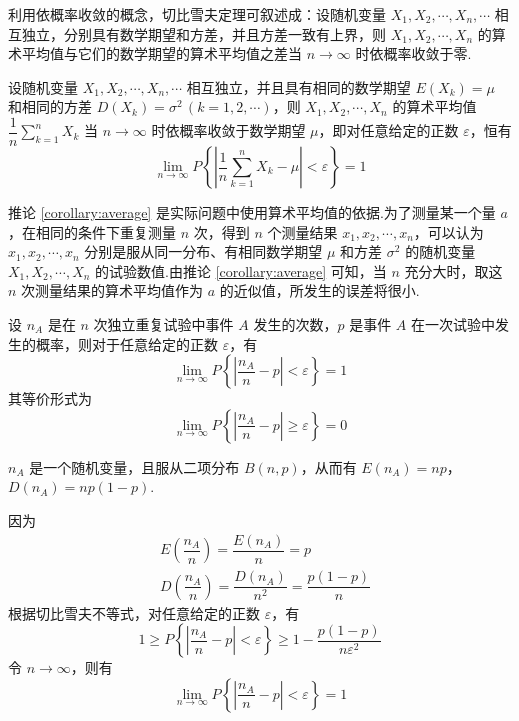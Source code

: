 利用依概率收敛的概念，切比雪夫定理可叙述成：设随机变量 $X_1, X_2, \cdots, X_n, \cdots$ 相互独立，分别具有数学期望和方差，并且方差一致有上界，则 $X_1, X_2, \cdots, X_n$ 的算术平均值与它们的数学期望的算术平均值之差当 $n \to \infty$ 时依概率收敛于零.

\begin{corollary} \label{corollary:average}
    设随机变量 $X_1, X_2, \cdots, X_n, \cdots$ 相互独立，并且具有相同的数学期望 $E(X_k) = \mu$ 和相同的方差 $D(X_k) = \sigma^2 \, (k=1,2,\cdots)$，则 $X_1, X_2, \cdots, X_n$ 的算术平均值 $\dfrac{1}{n} \displaystyle\sum_{k=1}^n X_k$ 当 $n \to \infty$ 时依概率收敛于数学期望 $\mu$，即对任意给定的正数 $\varepsilon$，恒有
    $$
    \lim_{n \to \infty} P \left\{ \left| \dfrac{1}{n} \sum_{k=1}^n X_k - \mu \right| < \varepsilon \right\} = 1
    $$
\end{corollary}

推论 \ref{corollary:average} 是实际问题中使用算术平均值的依据.为了测量某一个量 $a$，在相同的条件下重复测量 $n$ 次，得到 $n$ 个测量结果 $x_1,x_2,\cdots,x_n$，可以认为 $x_1,x_2,\cdots,x_n$ 分别是服从同一分布、有相同数学期望 $\mu$ 和方差 $\sigma^2$ 的随机变量 $X_1,X_2,\cdots,X_n$ 的试验数值.由推论 \ref{corollary:average} 可知，当 $n$ 充分大时，取这 $n$ 次测量结果的算术平均值作为 $a$ 的近似值，所发生的误差将很小.

\begin{theorem}[（伯努利定理）]
    设 $n_A$ 是在 $n$ 次独立重复试验中事件 $A$ 发生的次数，$p$ 是事件 $A$ 在一次试验中发生的概率，则对于任意给定的正数 $\varepsilon$，有
    $$
    \lim_{n \to \infty} P \left\{ \left| \dfrac{n_A}{n} - p \right| < \varepsilon \right\} = 1
    $$
    其等价形式为
    $$
    \lim_{n \to \infty} P \left\{ \left| \dfrac{n_A}{n} - p \right| \geqslant \varepsilon \right\} = 0
    $$
\end{theorem}

\begin{myproof}
    $n_A$ 是一个随机变量，且服从二项分布 $B(n,p)$，从而有 $E(n_A) = np$，$D(n_A) = np(1-p)$.

    因为
    $$
    \begin{aligned}
        & E(\dfrac{n_A}{n}) = \dfrac{E(n_A)}{n} = p \\
        & D(\dfrac{n_A}{n}) = \dfrac{D(n_A)}{n^2} = \dfrac{p(1-p)}{n}
    \end{aligned}
    $$
    根据切比雪夫不等式，对任意给定的正数 $\varepsilon$，有
    $$
    1 \geqslant P \left\{ \left| \dfrac{n_A}{n} - p \right| < \varepsilon \right\} \geqslant 1 - \dfrac{p(1-p)}{n \varepsilon^2}
    $$
    令 $n \to \infty$，则有
    $$
    \lim_{n \to \infty} P \left\{ \left| \dfrac{n_A}{n} - p \right| < \varepsilon \right\} = 1
    $$
\end{myproof}

